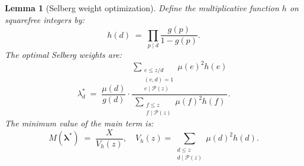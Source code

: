 \documentclass[12pt,a4paper]{amsart}
\newtheorem{lemma}[theorem]{Lemma}
\theoremstyle{definition}
\begin{document}
\begin{lemma}[Selberg weight optimization]\label{lem:optimization}
  Define the multiplicative function $h$ on squarefree integers by:
  \[
    h(d) \;=\; \prod_{p \mid d} \frac{g(p)}{1 - g(p)}.
  \]
  The optimal Selberg weights are:
  \[
    \lambda_d^* \;=\; \frac{\mu(d)}{g(d)} \cdot
      \frac{\displaystyle\sum_{\substack{e \leq z/d \\ (e,d)=1 \\ e \mid \mathcal{P}(z)}} \mu(e)^2 h(e)}
           {\displaystyle\sum_{\substack{f \leq z \\ f \mid \mathcal{P}(z)}} \mu(f)^2 h(f)}.
  \]
  The minimum value of the main term is:
  \[
    M(\boldsymbol{\lambda}^*) \;=\; \frac{X}{V_h(z)},
    \quad
    V_h(z) = \sum_{\substack{d \leq z \\ d \mid \mathcal{P}(z)}} \mu(d)^2 h(d).
  \]
\end{lemma}
\end{document}
